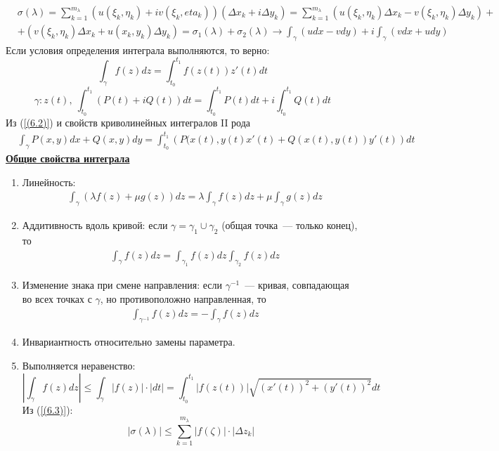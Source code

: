 \pr
\begin{align*}
  & \sigma(\lambda) = \sum_{k = 1}^{m_\lambda}\left( u(\xi_k, \eta_k) + iv(\xi_k, eta_k) \right)\left( \Delta x_k + i \Delta y_k \right) = \sum_{k = 1}^{m_\lambda}\left( u(\xi_k, \eta_k) \Delta x_k - v(\xi_k, \eta_k) \Delta y_k\right) + \\
  & + \left( v(\xi_k, \eta_k) \Delta x_k + u(x_k, y_k) \Delta y_k\right) = \sigma_1(\lambda) + \sigma_2(\lambda) \to \int_{\gamma}\left( u dx - v dy \right) + i \int_\gamma \left( v dx + u dy \right)
\end{align*}
\corollary
Если условия определения интеграла выполняются, то верно:
\begin{equation} \label{(6.3)}
  \int_\gamma f(z) dz = \int_{t_0}^{t_1}f(z(t))z'(t)dt
\end{equation}
\begin{equation} \label{(6.4)}
  \gamma: z(t), \ \int_{t_0}^{t_1}\left( P(t) + iQ(t) \right) dt = \int_{t_0}^{t_1}P(t)dt + i \int_{t_0}^{t_1}Q(t)dt
\end{equation}
\pr
Из (\ref{(6.2)}) и свойств криволинейных интегралов II рода
\begin{align*}
  &\int_{\gamma}P(x,y) dx + Q(x,y)dy = \int_{t_0}^{t_1} \left( P(x(t), y(t)x'(t) + Q(x(t), y(t))y'(t) \right) dt
\end{align*}
\underline{\textbf{Общие свойства интеграла}}
\begin{enumerate}
    \item Линейность:
    \begin{align*}
      &\int_{\gamma}\left(\lambda f(z) + \mu g(z)\right) dz = \lambda\int_{\gamma}f(z) dz + \mu \int_\gamma g(z) dz
    \end{align*}
    \item Аддитивность вдоль кривой: если $\gamma = \gamma_1 \cup \gamma_2$
    (общая точка~--- только конец), то
    \begin{align*}
      &\int_{\gamma}f(z) dz = \int_{\gamma_1}f(z) dz \int_{\gamma_2} f(z) dz
    \end{align*}
    \item Изменение знака при смене направления: если $\gamma^{-1}$~---
    кривая, совпадающая во всех точках с $\gamma$, но противоположно
    направленная, то
    \begin{align*}
      &\int_{\gamma^{-1}}f(z) dz = - \int_{\gamma}f(z) dz
    \end{align*}
    \item Инвариантность относительно замены параметра.
    \item \prop Выполняется неравенство:
    \begin{equation} \label{(6.5)}
      \left| \int_\gamma f(z) dz \right| \leq \int_{\gamma}\left| f(z) \right| \cdot \left| dt \right| = \int_{t_0}^{t_1} \left| f(z(t)) \right| \sqrt{(x'(t))^2 + (y'(t))^2}dt
    \end{equation}
    \pr
    Из (\ref{(6.3)}):
    \begin{equation} \label{(6.6)}
      \left| \sigma(\lambda) \right| \leq \sum_{k = 1}^{m_\lambda}\left| f(\zeta) \right| \cdot \left| \Delta z_k \right|
    \end{equation}
\end{enumerate}
